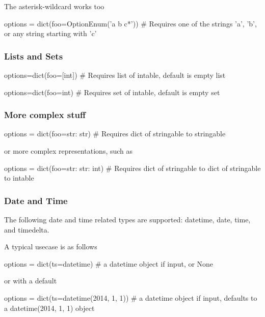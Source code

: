 The asterisk-wildcard works too

\begin{python}
  options = dict(foo=OptionEnum('a b c*'))
  # Requires one of the strings 'a', 'b', or any string starting with 'c'
\end{python}



\subsubsection*{Lists and Sets}
\begin{python}
options=dict(foo=[int])
# Requires list of intable, default is empty list
\end{python}

\begin{python}
options=dict(foo={int})
# Requires set of intable, default is empty set
\end{python}



\subsubsection*{More complex stuff}
\begin{python}
options = dict(foo={str: str})
# Requires dict of stringable to stringable
\end{python}
or more complex representations, such as

\begin{python}
options = dict(foo={str: {str: int}})
# Requires dict of stringable to dict of stringable to intable
\end{python}



\subsubsection*{Date and Time}
The following date and time related types are supported:
datetime, date, time, and timedelta.

A typical usecase is as follows

\begin{python}
options = dict(ts=datetime)
# a datetime object if input, or None
\end{python}
or with a default

\begin{python}
options = dict(ts=datetime(2014, 1, 1))
#  a datetime object if input, defaults to a datetime(2014, 1, 1) object
\end{python}


